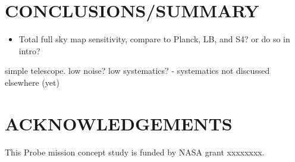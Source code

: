 \documentclass[]{spie}  %
\begin{document}
\section{CONCLUSIONS/SUMMARY}

\begin{itemize}
\item Total full sky map sensitivity, compare to Planck, LB, and S4? or do so in intro?
\end{itemize}
simple telescope. low noise? low systematics? - systematics not discussed elsewhere (yet)


\section{ACKNOWLEDGEMENTS}

This Probe mission concept study is funded by NASA grant xxxxxxxx.


\end{document}
